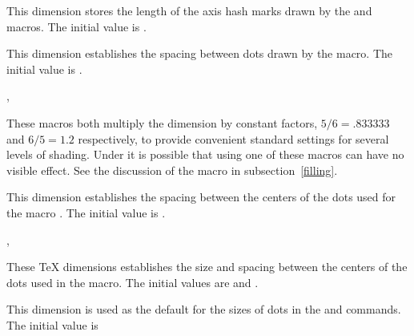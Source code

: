 \documentclass[letterpaper]{article}
\begin{document}
\begin{cd}
%
\end{cd}

This dimension stores the length of the axis hash marks drawn by the
 and  macros. The initial value is \dim{4pt}.

\begin{cd}
%
\end{cd}

This dimension establishes the spacing between dots drawn by the
 macro. The initial value is \dim{1pt}.

\begin{cd}
, %
%
\end{cd}

These macros both multiply the  dimension by constant
factors, $5/6=.833333$ and $6/5=1.2$ respectively, to provide convenient
standard settings for several levels of shading. Under \MF{} it is
possible that using one of these macros can have no visible effect. See
the discussion of the  macro in subsection~\ref{filling}.

\begin{cd}
%
\end{cd}

This dimension establishes the spacing between the centers of the dots
used for the macro . The initial value is \dim{10pt}.

\begin{cd}
, %
%
\end{cd}

These \TeX{} dimensions establishes the size and spacing between the
centers of the dots used in the  macro. The initial values
are \dim{0.5pt} and \dim{3pt}.

\begin{cd}
%
%
\end{cd}

This dimension is used as the default for the sizes of dots in the
 and  commands. The initial value is
\dim{0.5pt}
\end{document}
